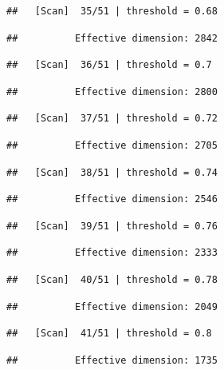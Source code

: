 \documentclass[
]{book}
\begin{document}
\begin{verbatim}
##   [Scan]  35/51 | threshold = 0.68
\end{verbatim}

\begin{verbatim}
##          Effective dimension: 2842
\end{verbatim}

\begin{verbatim}
##   [Scan]  36/51 | threshold = 0.7
\end{verbatim}

\begin{verbatim}
##          Effective dimension: 2800
\end{verbatim}

\begin{verbatim}
##   [Scan]  37/51 | threshold = 0.72
\end{verbatim}

\begin{verbatim}
##          Effective dimension: 2705
\end{verbatim}

\begin{verbatim}
##   [Scan]  38/51 | threshold = 0.74
\end{verbatim}

\begin{verbatim}
##          Effective dimension: 2546
\end{verbatim}

\begin{verbatim}
##   [Scan]  39/51 | threshold = 0.76
\end{verbatim}

\begin{verbatim}
##          Effective dimension: 2333
\end{verbatim}

\begin{verbatim}
##   [Scan]  40/51 | threshold = 0.78
\end{verbatim}

\begin{verbatim}
##          Effective dimension: 2049
\end{verbatim}

\begin{verbatim}
##   [Scan]  41/51 | threshold = 0.8
\end{verbatim}

\begin{verbatim}
##          Effective dimension: 1735
\end{verbatim}
\end{document}
